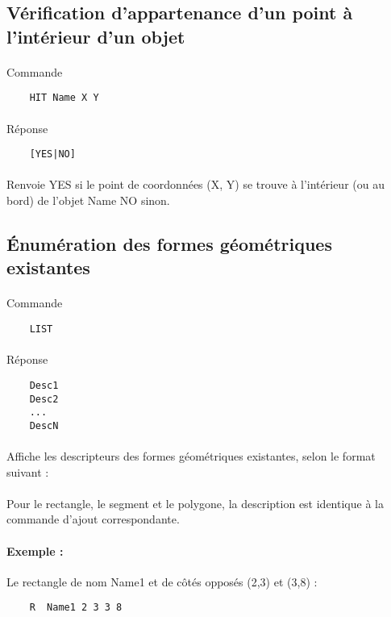 \subsection{Vérification d’appartenance d'un point à l'intérieur d'un objet}
 \paragraph{}
Commande
\begin{lstlisting}
	HIT Name X Y
\end{lstlisting}
\paragraph{}
Réponse
\begin{lstlisting}
	[YES|NO]
\end{lstlisting}
\paragraph{}
Renvoie YES si le point de coordonnées (X, Y) se trouve à l'intérieur (ou au bord) de l'objet Name NO sinon.

\subsection{Énumération des formes géométriques existantes}
 \paragraph{}
Commande
\begin{lstlisting}
	LIST
\end{lstlisting}
\paragraph{}
Réponse
\begin{lstlisting}
	Desc1
	Desc2
	...
	DescN
\end{lstlisting}
\paragraph{}
Affiche les descripteurs des formes géométriques existantes, selon le format suivant :
\paragraph{}
Pour le rectangle, le segment et le polygone, la description est identique à la commande d'ajout correspondante.
\paragraph{Exemple :}Le rectangle de nom Name1 et de côtés opposés (2,3) et (3,8) :
\begin{lstlisting}
	R  Name1 2 3 3 8
\end{lstlisting}
